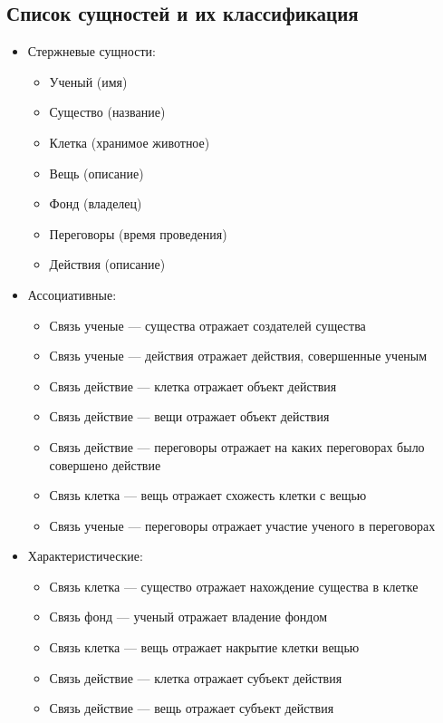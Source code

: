 \subsection{Список сущностей и их классификация}
\begin{itemize}
  \item Стержневые сущности:
    \begin{itemize}
      \item Ученый (имя)
      \item Существо (название)
      \item Клетка (хранимое животное)
      \item Вещь (описание)
      \item Фонд (владелец)
      \item Переговоры (время проведения)
      \item Действия (описание)
    \end{itemize}

  \item Ассоциативные:
    \begin{itemize}
      \item Связь ученые --- существа отражает создателей существа
      \item Связь ученые --- действия отражает действия, совершенные ученым
      \item Связь действие --- клетка отражает объект действия
      \item Связь действие --- вещи отражает объект действия
      \item Связь действие --- переговоры отражает на каких переговорах было совершено действие
      \item Связь клетка --- вещь отражает схожесть клетки с вещью
      \item Связь ученые --- переговоры отражает участие ученого в переговорах
    \end{itemize}

  \item Характеристические:
    \begin{itemize}
      \item Связь клетка --- существо отражает нахождение существа в клетке
      \item Связь фонд --- ученый отражает владение фондом
      \item Связь клетка --- вещь отражает накрытие клетки вещью
      \item Связь действие --- клетка отражает субъект действия
      \item Связь действие --- вещь отражает субъект действия
    \end{itemize}
\end{itemize}



